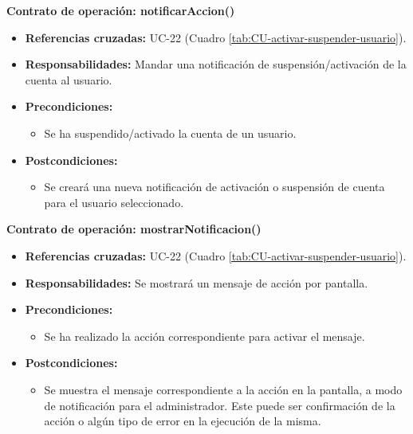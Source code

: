\textbf{Contrato de operación: notificarAccion()}
\begin{itemize}
\item \textbf{Referencias cruzadas:} UC-22 (Cuadro \ref{tab:CU-activar-suspender-usuario}).
\item \textbf{Responsabilidades:} Mandar una notificación de suspensión/activación de la cuenta al usuario.
\item \textbf{Precondiciones:} 
 \begin{itemize}
\item Se ha suspendido/activado la cuenta de un usuario.
\end {itemize}
\item \textbf{Postcondiciones:} 
 \begin{itemize}
\item Se creará una nueva notificación de activación o suspensión de cuenta para el usuario seleccionado.
\end {itemize}
\end {itemize}

\textbf{Contrato de operación: mostrarNotificacion()}
\begin{itemize}
\item \textbf{Referencias cruzadas:} UC-22 (Cuadro \ref{tab:CU-activar-suspender-usuario}).
\item \textbf{Responsabilidades:} Se mostrará un mensaje de acción por pantalla.
\item \textbf{Precondiciones:} 
 \begin{itemize}
\item Se ha realizado la acción correspondiente para activar el mensaje.
\end {itemize}
\item \textbf{Postcondiciones:} 
 \begin{itemize}
\item Se muestra el mensaje correspondiente a la acción en la pantalla, a modo de notificación para el administrador. Este puede ser confirmación de la acción o algún tipo de error en la ejecución de la misma.
\end {itemize}
\end {itemize}


\vspace{10mm}

